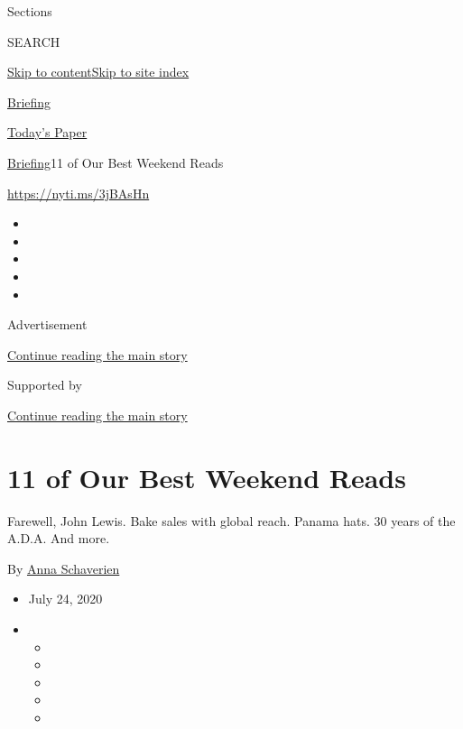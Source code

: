Sections

SEARCH

\protect\hyperlink{site-content}{Skip to
content}\protect\hyperlink{site-index}{Skip to site index}

\href{https://www.nytimes3xbfgragh.onion/interactive/2018/briefing/global-morning-briefing-newsletter-signup.html}{Briefing}

\href{https://myaccount.nytimes3xbfgragh.onion/auth/login?response_type=cookie\&client_id=vi}{}

\href{https://www.nytimes3xbfgragh.onion/section/todayspaper}{Today's
Paper}

\href{/interactive/2018/briefing/global-morning-briefing-newsletter-signup.html}{Briefing}\textbar{}11
of Our Best Weekend Reads

\url{https://nyti.ms/3jBAsHn}

\begin{itemize}
\item
\item
\item
\item
\item
\end{itemize}

Advertisement

\protect\hyperlink{after-top}{Continue reading the main story}

Supported by

\protect\hyperlink{after-sponsor}{Continue reading the main story}

\hypertarget{11-of-our-best-weekend-reads}{%
\section{11 of Our Best Weekend
Reads}\label{11-of-our-best-weekend-reads}}

Farewell, John Lewis. Bake sales with global reach. Panama hats. 30
years of the A.D.A. And more.

By \href{https://www.nytimes3xbfgragh.onion/by/anna-schaverien}{Anna
Schaverien}

\begin{itemize}
\item
  July 24, 2020
\item
  \begin{itemize}
  \item
  \item
  \item
  \item
  \item
  \end{itemize}
\end{itemize}

